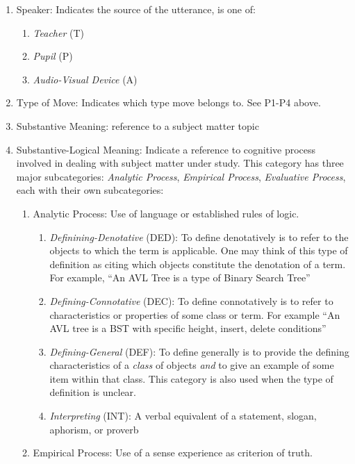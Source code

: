 \documentclass[conference]{IEEEtran}
\begin{document}
\begin{enumerate}
  \item{Speaker}: Indicates the source of the utterance, is one of:
  \begin{enumerate}
    \item \emph{Teacher} (T)
    \item \emph{Pupil} (P)
    \item \emph{Audio-Visual Device} (A)
  \end{enumerate}
  \item{Type of Move}: Indicates which type move belongs to. See P1-P4 above.
  \item {Substantive Meaning}: reference to a subject matter topic
  \item {Substantive-Logical Meaning}: Indicate a reference to cognitive process involved
    in dealing with subject matter under study. This category has three major
    subcategories: \emph{Analytic Process}, \emph{Empirical Process},
    \emph{Evaluative Process}, each with their own subcategories:
  \begin{enumerate}
    \item{Analytic Process}: Use of language or established rules of logic.
    \begin{enumerate}
      \item \emph{Definining-Denotative} (DED): To define denotatively is to
        refer to the objects to which the term is applicable. One may think of
        this type of definition as citing which objects constitute the
        denotation of a term. For example, ``An AVL Tree is a type of Binary
        Search Tree''
      \item \emph{Defining-Connotative} (DEC): To define connotatively is to
        refer to characteristics or properties of some class or term. For example ``An
        AVL tree is a BST with specific height, insert, delete conditions''
      \item \emph{Defining-General} (DEF): To define generally is to provide the
        defining characteristics of a \emph{class} of objects \emph{and} to give
        an example of some item within that class. This category is also used
        when the type of definition is unclear.
      \item \emph{Interpreting} (INT): A verbal equivalent of a statement, slogan, aphorism, or proverb
      \end{enumerate}
    \item{Empirical Process}: Use of a sense experience as criterion of truth.

\end{enumerate}
\end{enumerate}
\end{document}
